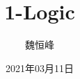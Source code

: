 \documentclass[]{beamer}
\title[1-Logic]{1-Logic}
\author[魏恒峰]{\large 魏恒峰}
\institute{hfwei@nju.edu.cn}
\date{2021年03月11日}
\begin{document}
\maketitle




\thankyou{}

\end{document}
